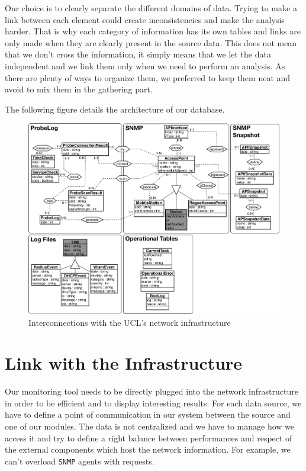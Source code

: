 Our choice is to clearly separate the different domains of data. Trying to make a link between each element could create inconsistencies and make the analysis harder. That is why each category of information has its own tables and links are only made when they are clearly present in the source data. This does not mean that we don't cross the information, it simply means that we let the data independent and we link them only when we need to perform an analysis. As there are plenty of ways to organize them, we preferred to keep them neat and avoid to mix them in the gathering part.

The following figure details the architecture of our database.
\begin{figure}[H]
\centering
  \includegraphics[width=1\linewidth]{Pictures/chapter3/db2.png}
  \caption{Interconnections with the UCL's network infrastructure}
\end{figure}


\section{Link with the Infrastructure}
Our monitoring tool needs to be directly plugged into the network infrastructure in order to be efficient and to display interesting results. For each data source, we have to define a point of communication in our system between the source and one of our modules. The data is not centralized and we have to manage how we access it and try to define a right balance between performances and respect of the external components which host the network information. For example, we can't overload \texttt{SNMP} agents with requests.

